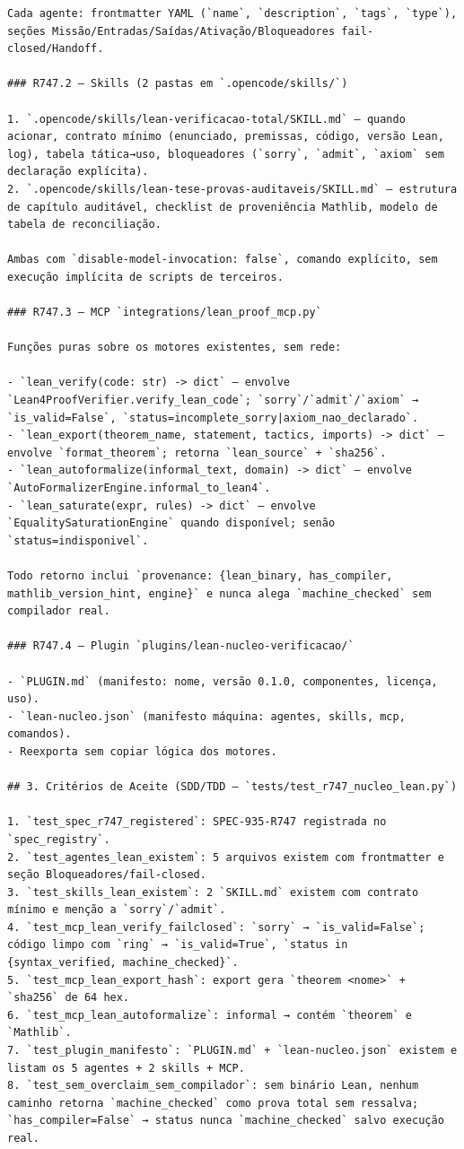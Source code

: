 \documentclass[12pt,openany,oneside,a4paper,brazil,chapter=TITLE]{abntex2}
\begin{document}
\begin{lstlisting}
Cada agente: frontmatter YAML (`name`, `description`, `tags`, `type`), seções Missão/Entradas/Saídas/Ativação/Bloqueadores fail-closed/Handoff.

### R747.2 — Skills (2 pastas em `.opencode/skills/`)

1. `.opencode/skills/lean-verificacao-total/SKILL.md` — quando acionar, contrato mínimo (enunciado, premissas, código, versão Lean, log), tabela tática→uso, bloqueadores (`sorry`, `admit`, `axiom` sem declaração explícita).
2. `.opencode/skills/lean-tese-provas-auditaveis/SKILL.md` — estrutura de capítulo auditável, checklist de proveniência Mathlib, modelo de tabela de reconciliação.

Ambas com `disable-model-invocation: false`, comando explícito, sem execução implícita de scripts de terceiros.

### R747.3 — MCP `integrations/lean_proof_mcp.py`

Funções puras sobre os motores existentes, sem rede:

- `lean_verify(code: str) -> dict` — envolve `Lean4ProofVerifier.verify_lean_code`; `sorry`/`admit`/`axiom` → `is_valid=False`, `status=incomplete_sorry|axiom_nao_declarado`.
- `lean_export(theorem_name, statement, tactics, imports) -> dict` — envolve `format_theorem`; retorna `lean_source` + `sha256`.
- `lean_autoformalize(informal_text, domain) -> dict` — envolve `AutoFormalizerEngine.informal_to_lean4`.
- `lean_saturate(expr, rules) -> dict` — envolve `EqualitySaturationEngine` quando disponível; senão `status=indisponivel`.

Todo retorno inclui `provenance: {lean_binary, has_compiler, mathlib_version_hint, engine}` e nunca alega `machine_checked` sem compilador real.

### R747.4 — Plugin `plugins/lean-nucleo-verificacao/`

- `PLUGIN.md` (manifesto: nome, versão 0.1.0, componentes, licença, uso).
- `lean-nucleo.json` (manifesto máquina: agentes, skills, mcp, comandos).
- Reexporta sem copiar lógica dos motores.

## 3. Critérios de Aceite (SDD/TDD — `tests/test_r747_nucleo_lean.py`)

1. `test_spec_r747_registered`: SPEC-935-R747 registrada no `spec_registry`.
2. `test_agentes_lean_existem`: 5 arquivos existem com frontmatter e seção Bloqueadores/fail-closed.
3. `test_skills_lean_existem`: 2 `SKILL.md` existem com contrato mínimo e menção a `sorry`/`admit`.
4. `test_mcp_lean_verify_failclosed`: `sorry` → `is_valid=False`; código limpo com `ring` → `is_valid=True`, `status in {syntax_verified, machine_checked}`.
5. `test_mcp_lean_export_hash`: export gera `theorem <nome>` + `sha256` de 64 hex.
6. `test_mcp_lean_autoformalize`: informal → contém `theorem` e `Mathlib`.
7. `test_plugin_manifesto`: `PLUGIN.md` + `lean-nucleo.json` existem e listam os 5 agentes + 2 skills + MCP.
8. `test_sem_overclaim_sem_compilador`: sem binário Lean, nenhum caminho retorna `machine_checked` como prova total sem ressalva; `has_compiler=False` → status nunca `machine_checked` salvo execução real.


\end{lstlisting}
\end{document}
